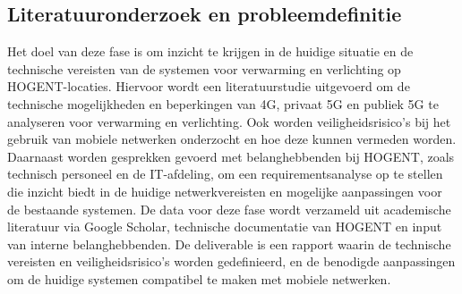 %
%
%
%
%


\subsection{Literatuuronderzoek en probleemdefinitie}
Het doel van deze fase is om inzicht te krijgen in de huidige situatie en de technische vereisten van de systemen voor verwarming en verlichting op HOGENT-locaties. Hiervoor wordt een literatuurstudie uitgevoerd om de technische mogelijkheden en beperkingen van 4G, privaat 5G en publiek 5G te analyseren voor verwarming en verlichting. Ook worden veiligheidsrisico's bij het gebruik van mobiele netwerken onderzocht en hoe deze kunnen vermeden worden. Daarnaast worden gesprekken gevoerd met belanghebbenden bij HOGENT, zoals technisch personeel en de IT-afdeling, om een requirementsanalyse op te stellen die inzicht biedt in de huidige netwerkvereisten en mogelijke aanpassingen voor de bestaande systemen. De data voor deze fase wordt verzameld uit academische literatuur via Google Scholar, technische documentatie van HOGENT en input van interne belanghebbenden. De deliverable is een rapport waarin de technische vereisten en veiligheidsrisico’s worden gedefinieerd, en de benodigde aanpassingen om de huidige systemen compatibel te maken met mobiele netwerken.


